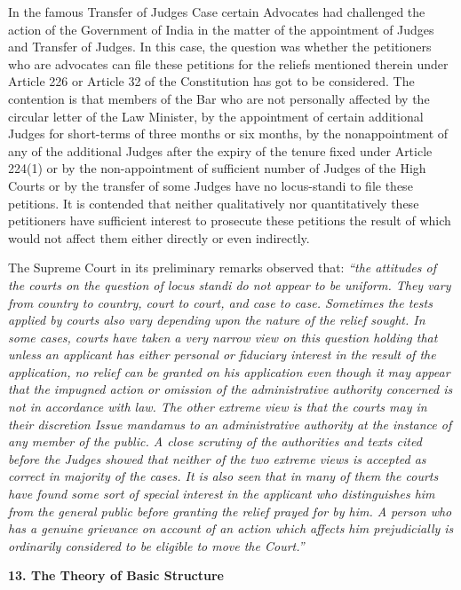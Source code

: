 \begin{multicols}{2}
\noi
In the famous Transfer of Judges Case certain Advocates had challenged the action of
the Government of India in the matter of the appointment of Judges and Transfer of
Judges. In this case, the question was whether the petitioners who are advocates can file
these petitions for the reliefs mentioned therein under Article 226 or Article 32 of the
Constitution has got to be considered. The contention is that members of the Bar who
are not personally affected by the circular letter of the Law Minister, by the appointment
of certain additional Judges for short-terms of three months or six months, by the nonappointment of any of the additional Judges after the expiry of the tenure fixed under
Article 224(1) or by the non-appointment of sufficient number of Judges of the High
Courts or by the transfer of some Judges have no locus-standi to file these petitions. It
is contended that neither qualitatively nor quantitatively these petitioners have
sufficient interest to prosecute these petitions the result of which would not affect them
either directly or even indirectly.

\noi
The Supreme Court in its preliminary remarks observed that: \textit{“the attitudes of the
courts on the question of locus standi do not appear to be uniform. They vary from
country to country, court to court, and case to case. Sometimes the tests applied by
courts also vary depending upon the nature of the relief sought. In some cases, courts have taken a very narrow view on this question holding that unless an applicant has
either personal or fiduciary interest in the result of the application, no relief can be
granted on his application even though it may appear that the impugned action or
omission of the administrative authority concerned is not in accordance with law. The
other extreme view is that the courts may in their discretion Issue mandamus to an
administrative authority at the instance of any member of the public. A close scrutiny
of the authorities and texts cited before the Judges showed that neither of the two
extreme views is accepted as correct in majority of the cases. It is also seen that in many
of them the courts have found some sort of special interest in the applicant who
distinguishes him from the general public before granting the relief prayed for by him.
A person who has a genuine grievance on account of an action which affects him
prejudicially is ordinarily considered to be eligible to move the Court.”}

\noi
{\bf 13. The Theory of Basic Structure}


\end{multicols}
